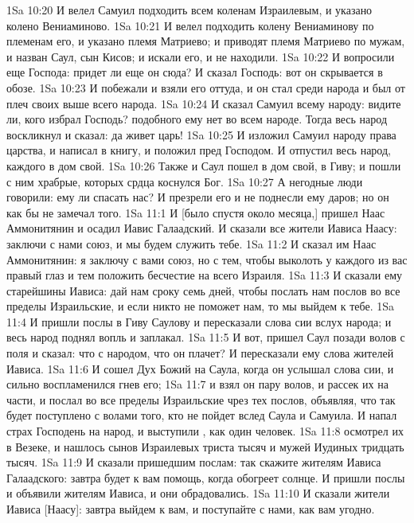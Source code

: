 \vs 1Sa 10:20 И велел Самуил подходить всем коленам Израилевым, и указано колено Вениаминово.
\vs 1Sa 10:21 И велел подходить колену Вениаминову по племенам его, и указано племя Матриево; и приводят племя Матриево по мужам, и назван Саул, сын Кисов; и искали его, и не находили.
\vs 1Sa 10:22 И вопросили еще Господа: придет ли еще он сюда? И сказал Господь: вот он скрывается в обозе.
\vs 1Sa 10:23 И побежали и взяли его оттуда, и он стал среди народа и был от плеч своих выше всего народа.
\vs 1Sa 10:24 И сказал Самуил всему народу: видите ли, кого избрал Господь? подобного ему нет во всем народе. Тогда весь народ воскликнул и сказал: да живет царь!
\vs 1Sa 10:25 И изложил Самуил народу права царства, и написал в книгу, и положил пред Господом. И отпустил весь народ, каждого в дом свой.
\vs 1Sa 10:26 Также и Саул пошел в дом свой, в Гиву; и пошли с ним храбрые, которых срдца коснулся Бог.
\vs 1Sa 10:27 А негодные люди говорили: ему ли спасать нас? И презрели его и не поднесли ему даров; но он как бы не замечал того.
\vs 1Sa 11:1 И [было спустя около месяца,] пришел Наас Аммонитянин и осадил Иавис Галаадский. И сказали все жители Иависа Наасу: заключи с нами союз, и мы будем служить тебе.
\vs 1Sa 11:2 И сказал им Наас Аммонитянин: я заключу с вами союз, но с тем, чтобы выколоть у каждого из вас правый глаз и тем положить бесчестие на всего Израиля.
\vs 1Sa 11:3 И сказали ему старейшины Иависа: дай нам сроку семь дней, чтобы послать нам послов во все пределы Израильские, и если никто не поможет нам, то мы выйдем к тебе.
\vs 1Sa 11:4 И пришли послы в Гиву Саулову и пересказали слова сии вслух народа; и весь народ поднял вопль и заплакал.
\vs 1Sa 11:5 И вот, пришел Саул позади волов с поля и сказал: что  с народом, что он плачет? И пересказали ему слова жителей Иависа.
\vs 1Sa 11:6 И сошел Дух Божий на Саула, когда он услышал слова сии, и сильно воспламенился гнев его;
\vs 1Sa 11:7 и взял он пару волов, и рассек их на части, и послал во все пределы Израильские чрез тех послов, объявляя, что так будет поступлено с волами того, кто не пойдет вслед Саула и Самуила. И напал страх Господень на народ, и выступили , как один человек.
\vs 1Sa 11:8  осмотрел их в Везеке, и нашлось сынов Израилевых триста тысяч и мужей Иудиных тридцать тысяч.
\vs 1Sa 11:9 И сказали пришедшим послам: так скажите жителям Иависа Галаадского: завтра будет к вам помощь, когда обогреет солнце. И пришли послы и объявили жителям Иависа, и они обрадовались.
\vs 1Sa 11:10 И сказали жители Иависа [Наасу]: завтра выйдем к вам, и поступайте с нами, как вам угодно.
